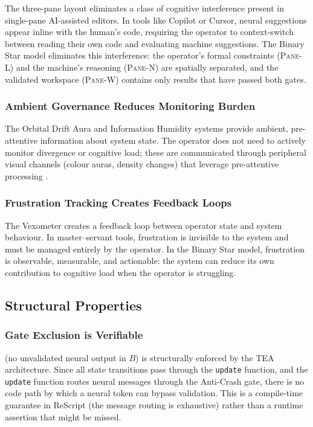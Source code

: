 \documentclass[11pt,a4paper]{article}
\newcommand{\paneL}{\textsc{Pane-L}}
\newcommand{\paneN}{\textsc{Pane-N}}
\newcommand{\paneW}{\textsc{Pane-W}}
\newcommand{\tea}{\textsc{TEA}}
\begin{document}
The three-pane layout eliminates a class of cognitive interference
present in single-pane AI-assisted editors. In tools like Copilot
or Cursor, neural suggestions appear inline with the human's code,
requiring the operator to context-switch between reading their own
code and evaluating machine suggestions. The Binary Star model
eliminates this interference: the operator's formal constraints
(\paneL{}) and the machine's reasoning (\paneN{}) are spatially
separated, and the validated workspace (\paneW{}) contains only
results that have passed both gates.

\subsubsection{Ambient Governance Reduces Monitoring Burden}

The Orbital Drift Aura and Information Humidity systems provide
ambient, pre-attentive information about system state. The operator
does not need to actively monitor divergence or cognitive load;
these are communicated through peripheral visual channels (colour
auras, density changes) that leverage pre-attentive processing
\citep{treisman1980feature}.

\subsubsection{Frustration Tracking Creates Feedback Loops}

The Vexometer creates a feedback loop between operator state and
system behaviour. In master--servant tools, frustration is invisible
to the system and must be managed entirely by the operator. In the
Binary Star model, frustration is observable, measurable, and
actionable: the system can reduce its own contribution to cognitive
load when the operator is struggling.

\subsection{Structural Properties}

\subsubsection{Gate Exclusion is Verifiable}

 (no unvalidated neural output in $B$) is
structurally enforced by the \tea{} architecture. Since all state
transitions pass through the \texttt{update} function, and the
\texttt{update} function routes neural messages through the
Anti-Crash gate, there is no code path by which a neural token can
bypass validation. This is a compile-time guarantee in ReScript
(the message routing is exhaustive) rather than a runtime assertion
that might be missed.
\end{document}
